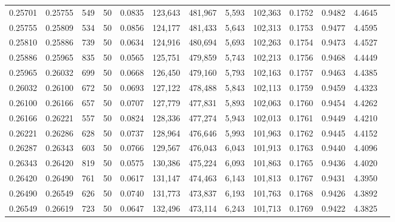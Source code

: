 \begin{tabular}{rrrrrrrrrrrrr}
0.25701 & 0.25755 &   549 &  50 &                                     0.0835 & 123,643 & 481,967 &   5,593 & 102,363 & 0.1752 & 0.9482 & 4.4645 \\
0.25755 & 0.25809 &   534 &  50 &                                     0.0856 & 124,177 & 481,433 &   5,643 & 102,313 & 0.1753 & 0.9477 & 4.4595 \\
0.25810 & 0.25886 &   739 &  50 &                                     0.0634 & 124,916 & 480,694 &   5,693 & 102,263 & 0.1754 & 0.9473 & 4.4527 \\
0.25886 & 0.25965 &   835 &  50 &                                     0.0565 & 125,751 & 479,859 &   5,743 & 102,213 & 0.1756 & 0.9468 & 4.4449 \\
0.25965 & 0.26032 &   699 &  50 &                                     0.0668 & 126,450 & 479,160 &   5,793 & 102,163 & 0.1757 & 0.9463 & 4.4385 \\
0.26032 & 0.26100 &   672 &  50 &                                     0.0693 & 127,122 & 478,488 &   5,843 & 102,113 & 0.1759 & 0.9459 & 4.4323 \\
0.26100 & 0.26166 &   657 &  50 &                                     0.0707 & 127,779 & 477,831 &   5,893 & 102,063 & 0.1760 & 0.9454 & 4.4262 \\
0.26166 & 0.26221 &   557 &  50 &                                     0.0824 & 128,336 & 477,274 &   5,943 & 102,013 & 0.1761 & 0.9449 & 4.4210 \\
0.26221 & 0.26286 &   628 &  50 &                                     0.0737 & 128,964 & 476,646 &   5,993 & 101,963 & 0.1762 & 0.9445 & 4.4152 \\
0.26287 & 0.26343 &   603 &  50 &                                     0.0766 & 129,567 & 476,043 &   6,043 & 101,913 & 0.1763 & 0.9440 & 4.4096 \\
0.26343 & 0.26420 &   819 &  50 &                                     0.0575 & 130,386 & 475,224 &   6,093 & 101,863 & 0.1765 & 0.9436 & 4.4020 \\
0.26420 & 0.26490 &   761 &  50 &                                     0.0617 & 131,147 & 474,463 &   6,143 & 101,813 & 0.1767 & 0.9431 & 4.3950 \\
0.26490 & 0.26549 &   626 &  50 &                                     0.0740 & 131,773 & 473,837 &   6,193 & 101,763 & 0.1768 & 0.9426 & 4.3892 \\
0.26549 & 0.26619 &   723 &  50 &                                     0.0647 & 132,496 & 473,114 &   6,243 & 101,713 & 0.1769 & 0.9422 & 4.3825 \\

\end{tabular}
